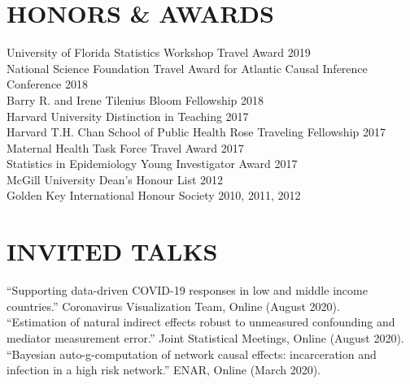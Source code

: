 \documentclass[12pt]{article}
\begin{document}
\section*{\textbf{{\large H}{ONORS} {\large \&} {\large A}{WARDS}}}
University of Florida Statistics Workshop Travel Award \hfill \hfill 2019 \\
National Science Foundation Travel Award for Atlantic Causal Inference Conference \hfill \hfill	2018 \\
Barry R. and Irene Tilenius Bloom Fellowship \hfill \hfill	2018 \\
Harvard University Distinction in Teaching \hfill \hfill 2017 \\
Harvard T.H. Chan School of Public Health Rose Traveling Fellowship \hfill \hfill	2017 \\
Maternal Health Task Force Travel Award \hfill \hfill	2017 \\
Statistics in Epidemiology Young Investigator Award  \hfill \hfill	2017 \\
McGill University Dean's Honour List  \hfill \hfill	2012 \\
Golden Key International Honour Society  \hfill \hfill2010, 2011, 2012 


\section*{\textbf{{\large I}{NVITED} {\large T}{ALKS}}}   


``Supporting data-driven COVID-19 responses in low and middle income countries.'' Coronavirus Visualization Team, Online (August 2020). \\

``Estimation of natural indirect effects robust to unmeasured confounding and mediator measurement error.'' Joint Statistical Meetings, Online (August 2020). \\

``Bayesian auto-g-computation of network causal effects: incarceration and infection in a high risk network.'' ENAR, Online (March 2020). \\
\end{document}
